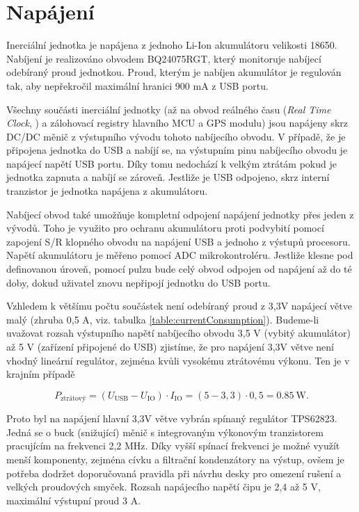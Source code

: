 \section{Napájení} \label{napajeni}
Inerciální jednotka je napájena z jednoho Li-Ion akumulátoru velikosti 18650. Nabíjení je realizováno obvodem BQ24075RGT, který monitoruje nabíjecí odebíraný proud jednotkou. Proud, kterým je nabíjen akumulátor je regulován tak, aby nepřekročil maximální hranici 900 mA z USB portu. \cite{F5eZCtr2LLRsr9NT}

Všechny součásti inerciální jednotky (až na obvod reálného času (\emph{Real Time Clock}, ) a zálohovací registry hlavního \ac{MCU} a \ac{GPS} modulu) jsou napájeny skrz DC/DC měnič z výstupního vývodu tohoto nabíjecího obvodu. V případě, že je připojena jednotka do \ac{USB} a nabíjí se, na výstupním pinu nabíjecího obvodu je napájecí napětí USB portu. Díky tomu nedochází k velkým ztrátám pokud je jednotka zapnuta a nabíjí se zároveň. Jestliže je \ac{USB} odpojeno, skrz interní tranzistor je jednotka napájena z akumulátoru. \cite{F5eZCtr2LLRsr9NT}

Nabíjecí obvod také umožňuje kompletní odpojení napájení jednotky přes jeden z vývodů. Toho je využito pro ochranu akumulátoru proti podvybití pomocí zapojení S/R klopného obvodu na napájení \ac{USB} a jednoho z výstupů procesoru. Napětí akumulátoru je měřeno pomocí \ac{ADC} mikrokontroléru. Jestliže klesne pod definovanou úroveň, pomocí pulzu bude celý obvod odpojen od napájení až do té doby, dokud uživatel znovu nepřipojí jednotku do \ac{USB} portu.



Vzhledem k většímu počtu součástek není odebíraný proud z 3,3V napájecí větve malý (zhruba 0,5 A, viz. tabulka \ref{table:currentConsumption}). Budeme-li uvažovat rozsah výstupního napětí nabíjecího obvodu 3,5 V (vybitý akumulátor) až 5 V (zařízení připojené do \ac{USB}) zjistíme, že pro napájení 3,3V větve není vhodný lineární regulátor, zejména kvůli vysokému ztrátovému výkonu. Ten je v krajním případě

\begin{equation}
P_{\mathrm{ztrátový}} = (U_{\mathrm{USB}}-U_{\mathrm{IO}})\cdot I_{\mathrm{IO}}=(5-3,3)\cdot 0,5= \SI{0,85}{\watt} .
\end{equation}

Proto byl na napájení hlavní 3,3V větve vybrán spínaný regulátor TPS62823. Jedná se o buck (snižující) měnič s integrovaným výkonovým tranzistorem pracujícím na frekvenci 2,2 MHz. Díky vyšší spínací frekvenci je možné využít menší komponenty, zejména cívku a filtrační kondenzátory na výstup, ovšem je potřeba dodržet doporučovaná pravidla při návrhu desky pro omezení rušení a velkých proudových smyček. Rozsah napájecího napětí čipu je 2,4 až 5 V, maximální výstupní proud 3 A. \cite{mGnys3WmOkWuaQHN}

